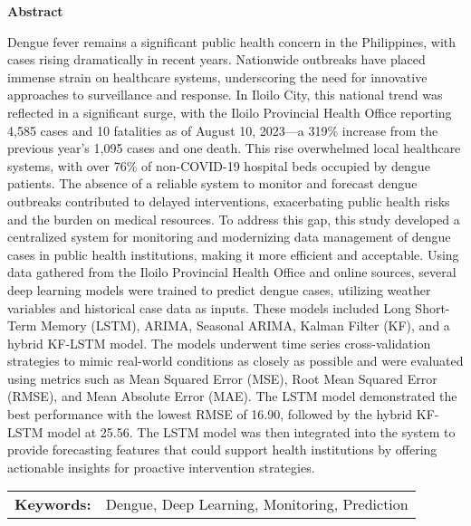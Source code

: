
\begin{center}
	\textbf{Abstract}
\end{center}

{\small
	\begin{spacing}{1.5}  %
		Dengue fever remains a significant public health concern in the Philippines, with cases rising dramatically in recent years. Nationwide outbreaks have placed immense strain on healthcare systems, underscoring the need for innovative approaches to surveillance and response. In Iloilo City, this national trend was reflected in a significant surge, with the Iloilo Provincial Health Office reporting 4,585 cases and 10 fatalities as of August 10, 2023—a 319\% increase from the previous year’s 1,095 cases and one death. This rise overwhelmed local healthcare systems, with over 76\% of non-COVID-19 hospital beds occupied by dengue patients. The absence of a reliable system to monitor and forecast dengue outbreaks contributed to delayed interventions, exacerbating public health risks and the burden on medical resources. To address this gap, this study developed a centralized system for monitoring and modernizing data management of dengue cases in public health institutions, making it more efficient and acceptable. Using data gathered from the Iloilo Provincial Health Office and online sources, several deep learning models were trained to predict dengue cases, utilizing weather variables and historical case data as inputs. These models included Long Short-Term Memory (LSTM), ARIMA, Seasonal ARIMA, Kalman Filter (KF), and a hybrid KF-LSTM model. The models underwent time series cross-validation strategies to mimic real-world conditions as closely as possible and were evaluated using metrics such as Mean Squared Error (MSE), Root Mean Squared Error (RMSE), and Mean Absolute Error (MAE). The LSTM model demonstrated the best performance with the lowest RMSE of 16.90, followed by the hybrid KF-LSTM model at 25.56. The LSTM model was then integrated into the system to provide forecasting features that could support health institutions by offering actionable insights for proactive intervention strategies.
	\end{spacing}
}

\vspace{0.5em}
\begin{tabular}{lp{4.25in}}
	\hspace{-0.5em}\textbf{Keywords:}\hspace{0.25em} & Dengue, Deep Learning, Monitoring, Prediction \\
\end{tabular}
